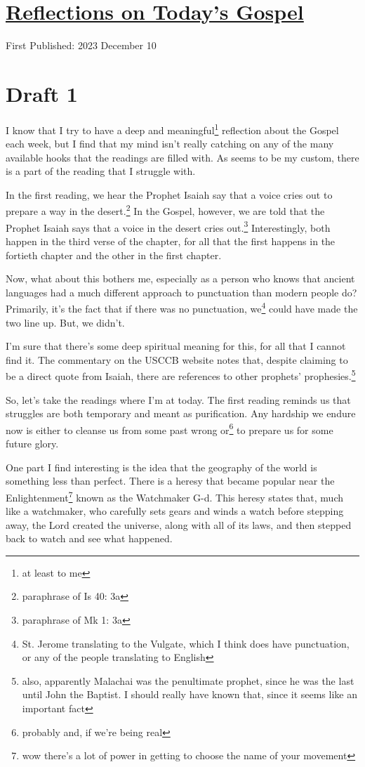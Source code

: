 \documentclass[12pt]{article}[titlepage]
\newcommand{\1}{\={a}}
\newcommand{\2}{\={e}}
\newcommand{\3}{\={\i}}
\newcommand{\4}{\=o}
\newcommand{\5}{\=u}
\newcommand{\6}{\={A}}
\renewcommand{\,}{\textsuperscript{,}}
\begin{document}
\doublespacing
\section{\href{reflections-on-readings-2-advent-b-23.html}{Reflections on Today's Gospel}}
First Published: 2023 December 10

\section{Draft 1}
I know that I try to have a deep and meaningful\footnote{at least to me} reflection about the Gospel each week, but I find that my mind isn't really catching on any of the many available hooks that the readings are filled with.
As seems to be my custom, there is a part of the reading that I struggle with.

In the first reading, we hear the Prophet Isaiah say that a voice cries out to prepare a way in the desert.\footnote{paraphrase of Is 40: 3a}
In the Gospel, however, we are told that the Prophet Isaiah says that a voice in the desert cries out.\footnote{paraphrase of Mk 1: 3a}
Interestingly, both happen in the third verse of the chapter, for all that the first happens in the fortieth chapter and the other in the first chapter.

Now, what about this bothers me, especially as a person who knows that ancient languages had a much different approach to punctuation than modern people do?
Primarily, it's the fact that if there was no punctuation, we\footnote{St. Jerome translating to the Vulgate, which I think does have punctuation, or any of the people translating to English} could have made the two line up.
But, we didn't.

I'm sure that there's some deep spiritual meaning for this, for all that I cannot find it.
The commentary on the USCCB website notes that, despite claiming to be a direct quote from Isaiah, there are references to other prophets' prophesies.\footnote{also, apparently Malachai was the penultimate prophet, since he was the last until John the Baptist. I should really have known that, since it seems like an important fact}

So, let's take the readings where I'm at today.
The first reading reminds us that struggles are both temporary and meant as purification.
Any hardship we endure now is either to cleanse us from some past wrong or\footnote{probably and, if we're being real} to prepare us for some future glory.

One part I find interesting is the idea that the geography of the world is something less than perfect.
There is a heresy that became popular near the Enlightenment\footnote{wow there's a lot of power in getting to choose the name of your movement} known as the Watchmaker G-d.
This heresy states that, much like a watchmaker, who carefully sets gears and winds a watch before stepping away, the Lord created the universe, along with all of its laws, and then stepped back to watch and see what happened.
\end{document}
